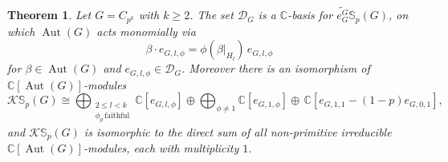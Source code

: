 \documentclass[10pt,a4paper]{amsart}
\newtheorem{theorem}{Theorem}
\newcommand{\Aut}{\operatorname{Aut}}
\newcommand{\kerlin}{\mathbb S_p}
\begin{document}
\begin{theorem}\label{thm:cyclic}
Let $G = C_{p^k}$ with $k\ge 2$. The set $\mathcal{D}_G$ is a $\mathbb C$-basis for 
$\widetilde{e_G^G}\kerlin(G)$, on which $\Aut(G)$ acts monomially via
\begin{equation}\label{eqn:phistar}
\beta\cdot e_{G, l, \phi} = \phi(\beta|_{H_l})\, e_{G, l, \phi}
\end{equation}
for $\beta\in\Aut(G)$ and $e_{G,l,\phi}\in\mathcal{D}_G$. Moreover there is an isomorphism 
of $\mathbb C[\Aut(G)]$-modules
\begin{equation}\label{eqn:cyclicfinal}
\mathcal K\kerlin(G) \cong \bigoplus_{\substack{2\le l< k\\ \phi_p\,\mathrm{faithful}}}
\mathbb C[e_{G, l, \phi}]
\oplus \bigoplus_{\phi\not = 1}\mathbb C[e_{G, 1, \phi}]
\oplus\, \mathbb C[e_{G, 1, 1} - (1-p)e_{G, 0, 1}],
\end{equation}
and $\mathcal{K}\kerlin(G)$ is isomorphic to the direct sum of all non-primitive irreducible
$\mathbb C[\Aut(G)]$-modules, each with multiplicity $1$.
\end{theorem}
\end{document}
